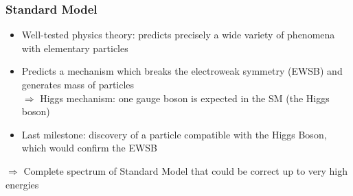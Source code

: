 \documentclass{beamer}
\begin{document}

   \begin{frame}
     \frametitle{Standard Model}

        \begin{itemize}
          \item Well-tested physics theory: predicts precisely a wide variety of phenomena with elementary particles
          \item Predicts a mechanism which breaks the electroweak symmetry (EWSB) and generates mass of particles \\
          $\Rightarrow$ Higgs mechanism: one gauge boson is expected in the SM (the Higgs boson)
          \item Last milestone: discovery of a particle compatible with the Higgs Boson, which would confirm the EWSB
        \end{itemize}
      
      \begin{center}
        $\Rightarrow$ Complete spectrum of Standard Model that could be correct up to very high energies
      \end{center}

   \end{frame} 
    
\end{document}
